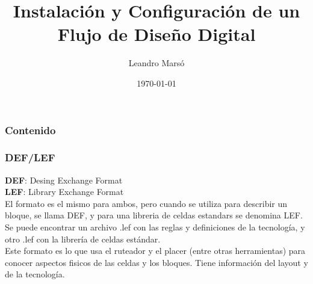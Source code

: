 \documentclass{beamer}
\title[Flujo Digital]{Instalación y Configuración de un Flujo de Diseño Digital} %
\author{Leandro Marsó} %
\institute[] %
{
Córdoba\\ %
\medskip
\textit{elleandro@gmail.com} %
}
\date{\today} %
\begin{document}


\begin{frame}
\titlepage %
\end{frame}

\begin{frame}
\frametitle{Contenido} %
\tableofcontents %
\end{frame}

\begin{frame}
\frametitle{DEF/LEF}

\textbf{DEF}: Desing Exchange Format \\
\textbf{LEF}: Library Exchange Format \\


El formato es el mismo para ambos, pero cuando se utiliza para describir un bloque, se llama DEF, y para una libreria de celdas estandars se denomina LEF.
Se puede encontrar un archivo .lef con las reglas y definiciones de la tecnolog\'ia, y otro .lef con la librer\'ia de celdas est\'andar.\\
Este formato es lo que usa el ruteador y el placer (entre otras herramientas) para conocer aspectos fisicos de las celdas y los bloques. Tiene informaci\'on del layout y de la tecnolog\'ia. 



\end{frame}
\end{document}
